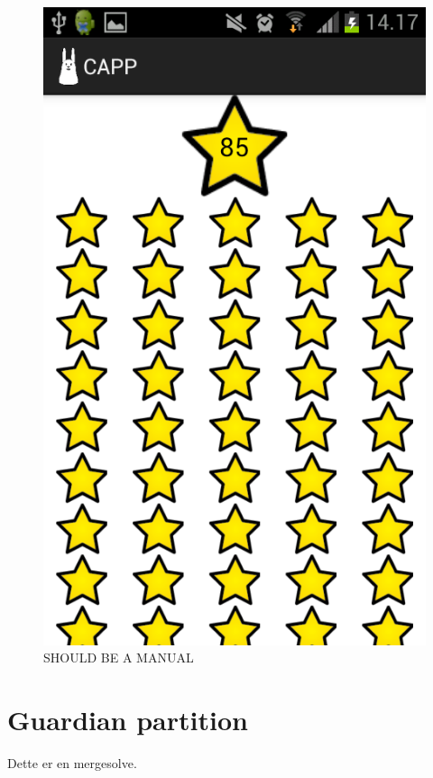 \begin{figure}
\begin{minipage}[b]{0.4\linewidth}
		\includegraphics[width=0.20\paperwidth]{Pictures/app-screenshots/capp_stars.png}
		\caption{SHOULD BE A MANUAL}
		\label{fig:change_me}
	\end{minipage}
\end{figure}

\section{Guardian partition}
Dette er en mergesolve.



% 